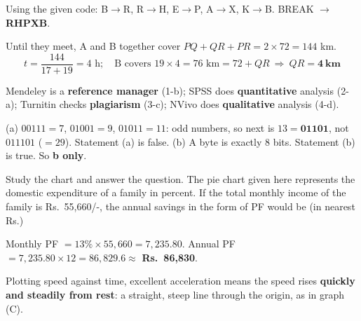 Using the given code: B$\rightarrow$R, R$\rightarrow$H, E$\rightarrow$P, A$\rightarrow$X, K$\rightarrow$B.
BREAK $\rightarrow$ \textbf{RHPXB}.

Until they meet, A and B together cover $PQ+QR+PR=2\times72=144$ km.
\[t=\frac{144}{17+19}=4\text{ h};\quad\text{B covers }19\times4=76\text{ km}=72+QR\ \Rightarrow\ QR=\mathbf{4\ km}\]

Mendeley is a \textbf{reference manager} (1-b); SPSS does \textbf{quantitative} analysis (2-a); Turnitin checks \textbf{plagiarism} (3-c); NVivo does \textbf{qualitative} analysis (4-d).

(a) $00111=7$, $01001=9$, $01011=11$: odd numbers, so next is $13=\mathbf{01101}$, not $011101$ ($=29$). Statement (a) is false.
(b) A byte is exactly 8 bits. Statement (b) is true. So \textbf{b only}.

Study the chart and answer the question. The pie chart given here represents the domestic expenditure of a family in percent. If the total monthly income of the family is Rs.~55,660/-, the annual savings in the form of PF would be (in nearest Rs.)


Monthly PF $=13\%\times55{,}660=7{,}235.80$.
Annual PF $=7{,}235.80\times12=86{,}829.6\approx$ \textbf{Rs.~86,830}.


Plotting speed against time, excellent acceleration means the speed rises \textbf{quickly and steadily from rest}: a straight, steep line through the origin, as in graph (C).

